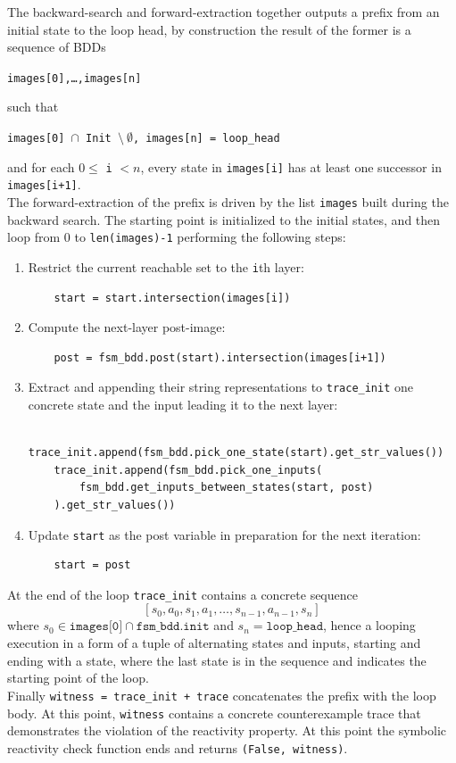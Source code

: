 The backward-search and forward-extraction together outputs a prefix from an initial state to the loop head, by construction the result of the former is a sequence of BDDs
\begin{center}
\texttt{images[0],…,images[n]}
\end{center}
such that
\begin{center}
\texttt{images[0] }\(\cap\)\texttt{ Init }\(\setminus \ \emptyset\)\texttt{, images[n] = {loop\_head}}
\end{center}
and for each \(0 \le\) \texttt{i} \(< n\), every state in \texttt{images[i]} has at 
least one successor in 
\texttt{images[i+1]}.\\[2ex]
The forward-extraction of the prefix is driven by the list \texttt{images} built during the backward search. The starting point is initialized to the initial states, and then loop from 0 to \texttt{len(images)-1} performing the following steps:
\begin{enumerate}
  \item Restrict the current reachable set to the \texttt{i}th layer:
        \scriptsize
        \begin{verbatim}
    start = start.intersection(images[i])
        \end{verbatim}
  \item Compute the next-layer post-image:
        \scriptsize
        \begin{verbatim}
    post = fsm_bdd.post(start).intersection(images[i+1])
        \end{verbatim}
  \item Extract and appending their string representations to \texttt{trace\_init} one 
        concrete state and the input leading it to the next layer:
        \scriptsize
        \begin{verbatim}
    trace_init.append(fsm_bdd.pick_one_state(start).get_str_values())
    trace_init.append(fsm_bdd.pick_one_inputs(
        fsm_bdd.get_inputs_between_states(start, post)
    ).get_str_values())
        \end{verbatim}
  \item Update \texttt{start} as the post variable in preparation for the next iteration:
        \scriptsize
        \begin{verbatim}
    start = post
        \end{verbatim}
\end{enumerate}
At the end of the loop \texttt{trace\_init} contains a concrete sequence  
\[
[s_0, a_0, s_1, a_1, \dots, s_{n-1}, a_{n-1}, s_n]
\]
where \(s_0\in\texttt{images[0]}\cap\texttt{fsm\_bdd.init}\) and \(s_n=\texttt{loop\_head}\), hence a looping execution in a form of a tuple of alternating states and inputs, starting and ending with a state, where the last state is in the sequence and indicates the starting point of the loop.\\[2ex]  
Finally \texttt{witness = trace\_init + trace} concatenates the prefix with the loop body. At this point, \texttt{witness} contains a concrete counterexample trace that demonstrates the violation of the reactivity property. At this point the symbolic reactivity check function ends and returns \texttt{(False, witness)}.